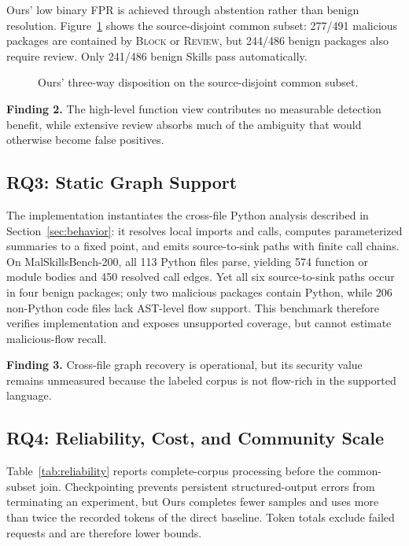 Ours' low binary FPR is achieved through abstention rather than benign
resolution. Figure~\ref{fig:triage} shows the source-disjoint common subset:
277/491 malicious packages are contained by \textsc{Block} or
\textsc{Review}, but 244/486 benign packages also require review. Only
241/486 benign Skills pass automatically.

\begin{figure}[!t]
  \centering
  \resizebox{0.98\columnwidth}{!}{}
  \caption{Ours' three-way disposition on the source-disjoint common subset.}
  \label{fig:triage}
\end{figure}

\noindent\textbf{Finding 2.} The high-level function view contributes no
measurable detection benefit, while extensive review absorbs much of the
ambiguity that would otherwise become false positives.

\subsection{RQ3: Static Graph Support}

The implementation instantiates the cross-file Python analysis described in
Section~\ref{sec:behavior}: it resolves local imports and calls, computes
parameterized summaries to a fixed point, and emits source-to-sink paths with
finite call chains. On MalSkillsBench-200, all 113 Python files parse, yielding
574 function or module bodies and 450 resolved call edges. Yet all six
source-to-sink paths occur in four benign packages; only two malicious packages
contain Python, while 206 non-Python code files lack AST-level flow support.
This benchmark therefore verifies implementation and exposes unsupported
coverage, but cannot estimate malicious-flow recall.

\noindent\textbf{Finding 3.} Cross-file graph recovery is operational, but its
security value remains unmeasured because the labeled corpus is not flow-rich
in the supported language.

\subsection{RQ4: Reliability, Cost, and Community Scale}

Table~\ref{tab:reliability} reports complete-corpus processing before the
common-subset join. Checkpointing prevents persistent structured-output errors
from terminating an experiment, but Ours completes fewer samples and uses more
than twice the recorded tokens of the direct baseline. Token totals exclude
failed requests and are therefore lower bounds.

